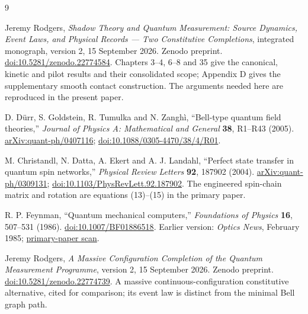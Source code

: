 \documentclass[11pt]{article}
\theoremstyle{definition}\newtheorem{definition}[theorem]{Definition}
\theoremstyle{remark}\newtheorem{remark}[theorem]{Remark}
\begin{document}
\begin{thebibliography}{9}

Jeremy Rodgers,
\emph{Shadow Theory and Quantum Measurement: Source Dynamics, Event Laws, and Physical Records --- Two Constitutive Completions},
integrated monograph, version 2, 15 September 2026. Zenodo preprint.
\href{https://doi.org/10.5281/zenodo.22774584}{doi:10.5281/zenodo.22774584}.
Chapters 3--4, 6--8 and 35 give the canonical, kinetic and pilot results and their consolidated scope; Appendix D gives the supplementary smooth contact construction. The arguments needed here are reproduced in the present paper.

D. D\"urr, S. Goldstein, R. Tumulka and N. Zangh\`i,
``Bell-type quantum field theories,''
\emph{Journal of Physics A: Mathematical and General} \textbf{38}, R1--R43 (2005).
\href{https://arxiv.org/abs/quant-ph/0407116}{arXiv:quant-ph/0407116};
\href{https://doi.org/10.1088/0305-4470/38/4/R01}{doi:10.1088/0305-4470/38/4/R01}.

M. Christandl, N. Datta, A. Ekert and A. J. Landahl,
``Perfect state transfer in quantum spin networks,''
\emph{Physical Review Letters} \textbf{92}, 187902 (2004).
\href{https://arxiv.org/abs/quant-ph/0309131}{arXiv:quant-ph/0309131};
\href{https://doi.org/10.1103/PhysRevLett.92.187902}{doi:10.1103/PhysRevLett.92.187902}.
The engineered spin-chain matrix and rotation are equations (13)--(15) in the primary paper.

R. P. Feynman, ``Quantum mechanical computers,''
\emph{Foundations of Physics} \textbf{16}, 507--531 (1986).
\href{https://doi.org/10.1007/BF01886518}{doi:10.1007/BF01886518}.
Earlier version: \emph{Optics News}, February 1985;
\href{https://www.cs.princeton.edu/courses/archive/fall05/frs119/papers/feynman85_optics_letters.pdf}{primary-paper scan}.

Jeremy Rodgers,
\emph{A Massive Configuration Completion of the Quantum Measurement Programme},
version 2, 15 September 2026. Zenodo preprint.
\href{https://doi.org/10.5281/zenodo.22774739}{doi:10.5281/zenodo.22774739}.
A massive continuous-configuration constitutive alternative, cited for comparison; its event law is distinct from the minimal Bell graph path.

\end{thebibliography}
\end{document}
